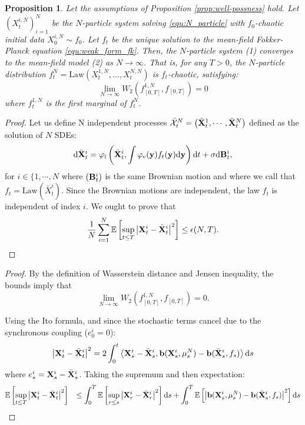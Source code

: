 \documentclass[aspectratio=169]{beamer}
\newtheorem{proposition}{Proposition}[section]
\begin{document}
\begin{frame}

\begin{proposition}\label{prop:propogation_of_chaos}
    Let the assumptions of Proposition \ref{prop:well-possness} hold. Let $(X_t^{i,N})_{i=1}^N$ be the $N$-particle system solving \eqref{equ:N_particle} with $f_0$-chaotic initial data $X_0^{i,N} \sim f_0$. Let $f_t$ be the unique solution to the mean-field Fokker-Planck equation \eqref{equ:weak_form_fk}. Then, the $N$-particle system (1) converges to the mean-field model (2) as $N \to \infty$. That is, for any $T > 0$, the $N$-particle distribution $f_t^N = \text{Law}(X_t^{1,N}, \dots, X_t^{N,N})$ is $f_t$-chaotic, satisfying:\[
    \lim_{N \to \infty}W_2\left(f^{1,N}_{[0,T]},f_{[0,T]}\right) =0
\]
where $f_t^{1,N}$ is the first marginal of $f_t^N$.
\end{proposition}
    
\end{frame}
\begin{frame}
   \begin{proof}
    Let us define N independent processes $\bar{\mathcal X}_t^N = \left(\bar {\mathbf{X}}^1_t,\cdots, \bar {\mathbf{X}}^N_t\right)$ defined as the solution of $N$ SDEs:
    \[
    \mathrm{d} \bar{\mathbf{X}}^i_t  =  \varphi_{\text{i}}\left(\bar{\mathbf{X}}^i_t,\int  \varphi_{\text{e}}(\mathbf{y} ) f_t(\mathbf{y})\mathrm{d}\mathbf{y}\right)\mathrm{d} t + \sigma \mathrm{d} \mathbf{B}^i_t,
    \]
    for $i\in \{1,\cdots,N$ where $(\mathbf{B}^i_t)$ is the same Brownian motion and where we call that $f_t= \mathrm{Law}(\bar{X}_t^i)$. Since the Brownian motions are independent, the law $f_t$ is independent of index $i$. We ought to prove that 
    \[
       \frac{1}{N}\sum_{i=1}^N \mathbb E\left[\sup_{t\leq T}\left|\mathbf{X}^i_t-\bar{\mathbf{X}}^i_t\right|^2\right] \leq \epsilon (N,T).
    \]
    \end{proof} 
\end{frame}
\begin{frame}
   \begin{proof}
    By the definition of Wasserstein distance and Jensen inequality, the bounds imply that  \[
    \lim_{N \to \infty}W_2\left(f^{1,N}_{[0,T]},f_{[0,T]}\right) =0. 
\]

Using the Ito formula, and since the stochastic terms cancel due to the synchronous coupling ($e_0^i=0$):
\[
\left|\mathbf{X}^i_t - \bar{\mathbf{X}}^i_t\right|^2 = 2 \int_0^t \left\langle \mathbf{X}^i_s - \bar{\mathbf{X}}^i_s, \mathbf{b}(\mathbf{X}^i_s, \mu_s^N) - \mathbf{b}(\bar{\mathbf{X}}^i_s, f_s) \right\rangle \mathrm{d} s
\]
where $e_s^i = \mathbf{X}^i_s - \bar{\mathbf{X}}^i_s$. Taking the supremum and then expectation:
\[
\begin{aligned}
& \mathbb E\left[\sup_{t\leq T}\left|\mathbf{X}^i_t-\bar{\mathbf{X}}^i_t\right|^2\right]
& \leq \int_0^T \mathbb E\left[\sup_{r\leq s}\left|\mathbf{X}^i_r-\bar{\mathbf{X}}^i_r\right|^2\right] \mathrm{d} s + \int_0^T \mathbb E\left[ \left| \mathbf{b}(\mathbf{X}^i_s, \mu_s^N) - \mathbf{b}(\bar{\mathbf{X}}^i_s, f_s) \right|^2 \right] \mathrm{d} s
\end{aligned}
\]
    \end{proof} 
\end{frame}
\end{document}
